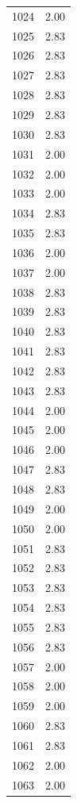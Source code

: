 \documentclass[a4paper,11pt]{article}
\begin{document}
\begin{center}
\begin{longtable}{|R{1.5cm}|R{2.5cm}|}
 1024  &         2.00 \\ 
 1025  &         2.83 \\ 
 1026  &         2.83 \\ 
 1027  &         2.83 \\ 
 1028  &         2.83 \\ 
 1029  &         2.83 \\ 
 1030  &         2.83 \\ 
 1031  &         2.00 \\ 
 1032  &         2.00 \\ 
 1033  &         2.00 \\ 
 1034  &         2.83 \\ 
 1035  &         2.83 \\ 
 1036  &         2.00 \\ 
 1037  &         2.00 \\ 
 1038  &         2.83 \\ 
 1039  &         2.83 \\ 
 1040  &         2.83 \\ 
 1041  &         2.83 \\ 
 1042  &         2.83 \\ 
 1043  &         2.83 \\ 
 1044  &         2.00 \\ 
 1045  &         2.00 \\ 
 1046  &         2.00 \\ 
 1047  &         2.83 \\ 
 1048  &         2.83 \\ 
 1049  &         2.00 \\ 
 1050  &         2.00 \\ 
 1051  &         2.83 \\ 
 1052  &         2.83 \\ 
 1053  &         2.83 \\ 
 1054  &         2.83 \\ 
 1055  &         2.83 \\ 
 1056  &         2.83 \\ 
 1057  &         2.00 \\ 
 1058  &         2.00 \\ 
 1059  &         2.00 \\ 
 1060  &         2.83 \\ 
 1061  &         2.83 \\ 
 1062  &         2.00 \\ 
 1063  &         2.00 \\ 

\end{longtable}
\end{center}
\end{document}
